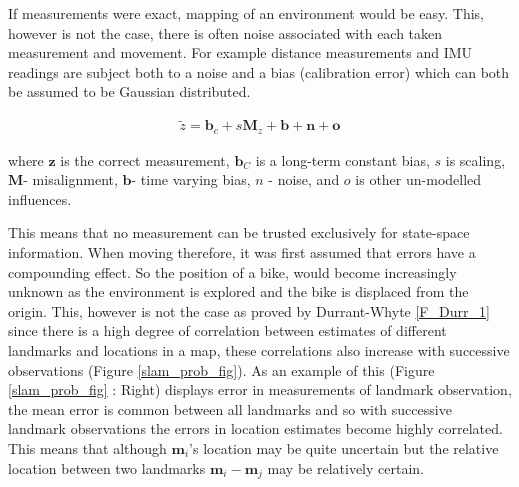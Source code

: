 \documentclass[a4paper,11pt,notitlepage]{article}
\begin{document}
If measurements were exact, mapping of an environment would be easy. This, however is not the case, there is often noise associated with each taken measurement and movement. For example distance measurements and IMU readings are subject both to a noise and a bias (calibration error) which can both be assumed to be Gaussian distributed.

\begin{equation}
\begin{aligned}
\tilde{z} = \textbf{b}_{c} + s\textbf{M}_{z} + \textbf{b} + \textbf{n} + \textbf{o}
\end{aligned}
\end{equation}

where $\textbf{z}$ is the correct measurement, $\textbf{b}_{C}$ is a long-term constant bias, $s$ is scaling, $\textbf{M}$- misalignment, $\textbf{b}$- time varying bias, $n$ - noise, and $o$ is other un-modelled influences. 
\newline\newline

This means that no measurement can be trusted exclusively for state-space information. When moving therefore, it was first assumed that errors have a compounding effect. So the position of a bike, would become increasingly unknown as the environment is explored and the bike is displaced from the origin. This, however is not the case as proved by Durrant-Whyte \ref{F_Durr_1} since there is a high degree of correlation between estimates of different landmarks and locations in a map, these correlations also increase with successive observations (Figure \ref{slam_prob_fig}). As an example of this (Figure \ref{slam_prob_fig} : Right) displays error in measurements of landmark observation, the mean error is common between all landmarks and so with successive landmark observations the errors in location estimates become highly correlated. This means that although $\textbf{m}_{i}$'s location may be quite uncertain but the relative location between two landmarks $\textbf{m}_{i}-\textbf{m}_{j}$ may be relatively certain.
\end{document}
